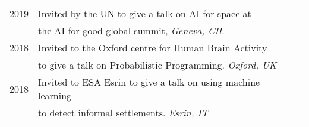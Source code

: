 \documentclass[10pt,a4paper]{altacv}
\begin{document}


\begin{tabular}{rll}
2019 & Invited by the UN to give a talk on AI for space at \\
& the AI for good global summit, \emph{Geneva, CH}.\\
2018 & Invited to the Oxford centre for Human Brain Activity \\
 &  to give a talk on Probabilistic Programming. \emph{Oxford, UK}\\
2018 & Invited to ESA Esrin to give  a talk on using machine learning\\
& to detect informal settlements. \emph{Esrin, IT}\\
\end{tabular}







\end{document}

